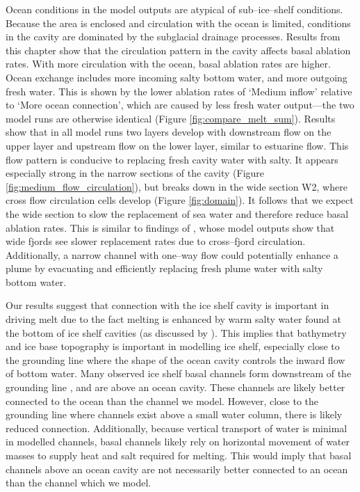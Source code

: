 Ocean conditions in the model outputs are atypical of sub--ice--shelf conditions. Because the area is enclosed and circulation with the ocean is limited, conditions in the cavity are dominated by the subglacial drainage processes.
Results from this chapter show that the circulation pattern in the cavity affects basal ablation rates. With more circulation with the ocean, basal ablation rates are higher. Ocean exchange includes more incoming salty bottom water, and more outgoing fresh water. This is shown by the lower ablation rates of `Medium inflow' relative to `More ocean connection', which are caused by less fresh water output---the two model runs are otherwise identical (Figure \ref{fig:compare_melt_sum}).  Results show that in all model runs two layers develop with downstream flow on the upper layer and upstream flow on the lower layer,  similar to estuarine flow. This flow pattern is conducive to replacing fresh cavity water with salty. It appears especially strong in the narrow sections of the cavity (Figure \ref{fig:medium_flow_circulation}), but breaks down in the wide section W2, where cross flow circulation cells develop (Figure \ref{fig:domain}). It follows that we expect the wide section to slow the replacement of sea water and therefore reduce basal ablation rates. This is similar to findings of \cite{carroll2017subglacial}, whose model outputs show that wide fjords see slower replacement rates due to cross--fjord circulation. Additionally, a narrow channel with one--way flow could potentially enhance a plume by evacuating and efficiently replacing fresh plume water with salty bottom water.

Our results suggest that connection with the ice shelf cavity is important in driving melt due to the fact melting is enhanced by warm salty water found at the bottom of ice shelf cavities  (as discussed by \cite{goldberg2019accurately}). This implies that bathymetry and ice base topography is important in modelling ice shelf, especially close to the grounding line where the shape of the ocean cavity controls the inward flow of bottom water. 
Many observed ice shelf basal channels form downstream of the grounding line \citep{alley2016impacts}, and are above an ocean cavity. These channels are likely better connected to the ocean than the channel we model. However, close to the grounding line where channels exist above a small water column, there is likely reduced connection. Additionally, because vertical transport of water is minimal in modelled channels, basal channels likely rely on horizontal movement of water masses to supply heat and salt required for melting. This would imply that basal channels above an ocean cavity are not necessarily better connected to an ocean than the channel which we model. 


